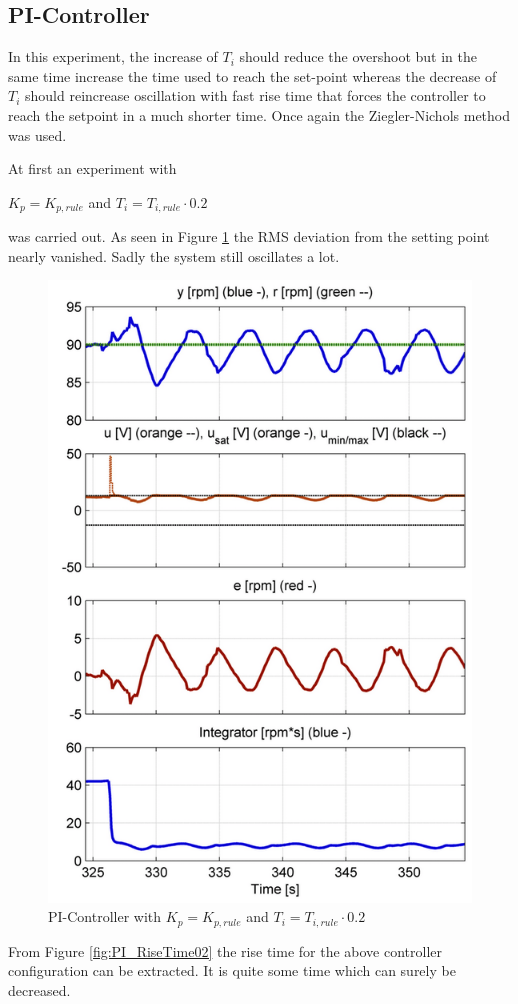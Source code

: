 \subsection{PI-Controller}

In this experiment, the increase of $T_{i}$ should reduce the overshoot but in the same time increase the time used to reach the set-point whereas the decrease of $ T_{i}$ should reincrease oscillation with fast rise time that forces the controller to reach the setpoint in a much shorter time.
Once again the Ziegler-Nichols method was used.

At first an experiment with
\begin{center}
{$K_{p}= K_{p,rule}$ and $T_i = T_{i,rule}\cdot0.2$}
\end{center}

was carried out. As seen in Figure \ref{fig:PI_Controller02} the RMS deviation from the setting point nearly vanished. Sadly the system still oscillates a lot.

\begin{figure}[H]
\begin{center}
\includegraphics[width=0.5\linewidth]{images/general/PI/PI_Controller02}
\end{center}
\caption{PI-Controller with $K_{p}= K_{p,rule}$ and $T_i = T_{i,rule}\cdot0.2$}
\label{fig:PI_Controller02}
\end{figure}


From Figure \ref{fig:PI_RiseTime02} the rise time for the above controller configuration can be extracted. It is quite some time which can surely be decreased.

